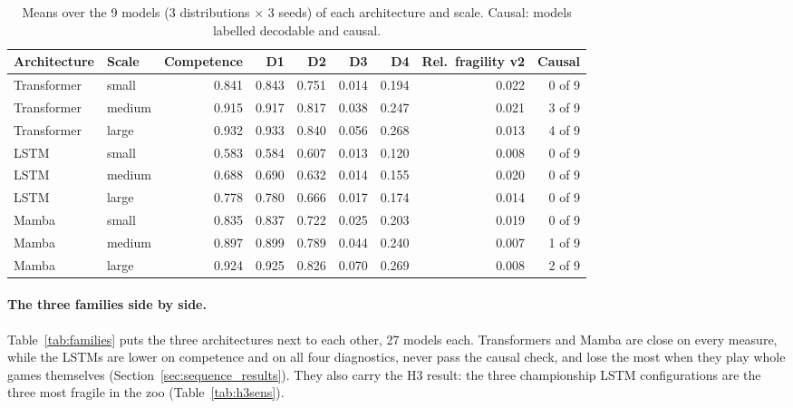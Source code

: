 \documentclass[11pt]{scrartcl}
\begin{document}
\begin{table}[H]
    \centering
    \small
    \begin{tabular}{llrrrrrrr}
    \toprule
    Architecture & Scale & Competence & D1 & D2 & D3 & D4 & Rel.\ fragility v2 & Causal \\
    \midrule
    Transformer & small & 0.841 & 0.843 & 0.751 & 0.014 & 0.194 & 0.022 & 0 of 9 \\
    Transformer & medium & 0.915 & 0.917 & 0.817 & 0.038 & 0.247 & 0.021 & 3 of 9 \\
    Transformer & large & 0.932 & 0.933 & 0.840 & 0.056 & 0.268 & 0.013 & 4 of 9 \\
    LSTM & small & 0.583 & 0.584 & 0.607 & 0.013 & 0.120 & 0.008 & 0 of 9 \\
    LSTM & medium & 0.688 & 0.690 & 0.632 & 0.014 & 0.155 & 0.020 & 0 of 9 \\
    LSTM & large & 0.778 & 0.780 & 0.666 & 0.017 & 0.174 & 0.014 & 0 of 9 \\
    Mamba & small & 0.835 & 0.837 & 0.722 & 0.025 & 0.203 & 0.019 & 0 of 9 \\
    Mamba & medium & 0.897 & 0.899 & 0.789 & 0.044 & 0.240 & 0.007 & 1 of 9 \\
    Mamba & large & 0.924 & 0.925 & 0.826 & 0.070 & 0.269 & 0.008 & 2 of 9 \\
    \bottomrule
    \end{tabular}
    \caption{Means over the 9 models (3 distributions $\times$ 3 seeds) of each architecture and scale. Causal:
    models labelled decodable and causal.}
    \label{tab:descriptives}
\end{table}

\paragraph{The three families side by side.} Table~\ref{tab:families} puts the three architectures next to
each other, 27 models each. Transformers and Mamba are close on every measure, while the LSTMs are lower on
competence and on all four diagnostics, never pass the causal check, and lose the most when they play whole
games themselves (Section~\ref{sec:sequence_results}). They also carry the H3 result: the three championship
LSTM configurations are the three most fragile in the zoo (Table~\ref{tab:h3sens}).
\end{document}
